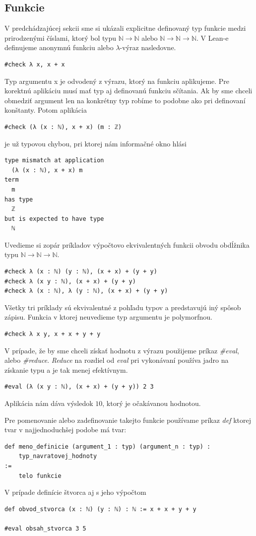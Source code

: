 \documentclass[a4paper,10pt,oneside]{report}%
\begin{document}
\subsection{Funkcie}
    V predchádzajúcej sekcii sme si ukázali explicitne definovaný typ funkcie medzi prirodzenými číslami, ktorý bol typu $\mathbb{N} \to \mathbb{N}$ alebo $\mathbb{N} \to \mathbb{N} \to \mathbb{N}$.
V Lean-e definujeme anonymnú funkciu alebo $\lambda$-výraz nasledovne.
\begin{lstlisting}
#check λ x, x + x
\end{lstlisting}
    Typ argumentu x je odvodený z výrazu, ktorý na funkciu aplikujeme.
    Pre korektnú aplikáciu musí mať typ aj definovanú funkciu sčítania.
    Ak by sme chceli obmedziť argument len na konkrétny typ robíme to podobne ako
pri definovaní konštanty. Potom aplikácia
\begin{lstlisting}
#check (λ (x : ℕ), x + x) (m : ℤ)
\end{lstlisting}
je už typovou chybou, pri ktorej nám informačné okno hlási
\begin{lstlisting}
type mismatch at application
  (λ (x : ℕ), x + x) m
term
  m
has type
  ℤ
but is expected to have type
  ℕ
\end{lstlisting}
    Uvedieme si zopár príkladov výpočtovo ekvivalentných funkcii obvodu obdĺžnika typu
$\mathbb{N} \to \mathbb{N} \to \mathbb{N}$.
\begin{lstlisting}
#check λ (x : ℕ) (y : ℕ), (x + x) + (y + y)
#check λ (x y : ℕ), (x + x) + (y + y)
#check λ (x : ℕ), λ (y : ℕ), (x + x) + (y + y)
\end{lstlisting}
    Všetky tri príklady sú ekvivalentné z pohľadu typov a predstavujú iný spôsob
zápisu.
    Funkcia v ktorej neuvedieme typ argumentu je polymorfnou.
\begin{lstlisting}
#check λ x y, x + x + y + y
\end{lstlisting}

    V prípade, že by sme chceli získať hodnotu z výrazu použijeme príkaz \emph{\#eval},
alebo \emph{\#reduce}. \emph{Reduce} na rozdiel od \emph{eval} pri vykonávaní používa
jadro na získanie typu a je tak menej efektívnym.
\begin{lstlisting}
#eval (λ (x y : ℕ), (x + x) + (y + y)) 2 3
\end{lstlisting}
    Aplikácia nám dáva výsledok $10$, ktorý je očakávanou hodnotou.

    Pre pomenovanie alebo zadefinovanie takejto funkcie používame príkaz \emph{def}
ktorej tvar v najjednoduchšej podobe má tvar:
\begin{lstlisting}
def meno_definicie (argument_1 : typ) (argument_n : typ) :
    typ_navratovej_hodnoty 
:=
    telo funkcie
\end{lstlisting}
V prípade definície štvorca aj s jeho výpočtom
\begin{lstlisting}
def obvod_stvorca (x : ℕ) (y : ℕ) : ℕ := x + x + y + y

#eval obsah_stvorca 3 5
\end{lstlisting}
\end{document}
